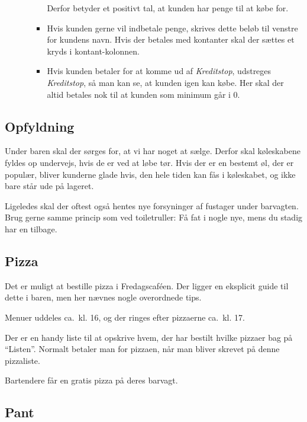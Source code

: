 \begin{itemize}
\begin{itemize}
\begin{itemize}
      Derfor betyder et positivt tal, at kunden har penge til at købe for.
    \item Hvis kunden gerne vil indbetale penge, skrives dette beløb
      til venstre for kundens navn.
      Hvis der betales med kontanter skal der sættes et kryds i kontant-kolonnen.
    \item Hvis kunden betaler for at komme ud af \emph{Kreditstop},
      udstreges \emph{Kreditstop}, så man kan se, at kunden igen kan
      købe. Her skal der altid betales nok til at kunden som minimum går i 0.
    \end{itemize}
  \end{itemize}
\end{itemize}

\subsection{Opfyldning}
\label{sec:intra:opfyldning}

Under baren skal der sørges for, at vi har noget at sælge. Derfor skal
køleskabene fyldes op undervejs, hvis de er ved at løbe tør. Hvis der
er en bestemt øl, der er populær, bliver kunderne glade hvis, den hele
tiden kan fås i køleskabet, og ikke bare står ude på lageret.

Ligeledes skal der oftest også hentes nye forsyninger af fustager
under barvagten. Brug gerne samme princip som ved toiletruller: Få fat
i nogle nye, mens du stadig har en tilbage.

\subsection{Pizza}
\label{sec:intra:pizza}

Det er muligt at bestille pizza i Fredagscaféen. Der ligger en
eksplicit guide til dette i baren, men her nævnes nogle overordnede tips.

Menuer uddeles ca.\ kl. 16, og der ringes efter pizzaerne ca.\ kl. 17.

Der er en handy liste til at opskrive hvem, der har bestilt hvilke
pizzaer bag på ``Listen''. Normalt betaler man for pizzaen, når man
bliver skrevet på denne pizzaliste.

Bartendere får en gratis pizza på deres barvagt.

\subsection{Pant}
\label{sec:intra:pant}

